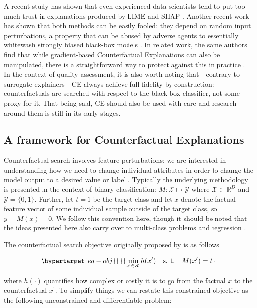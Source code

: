 \documentclass{juliacon}
\begin{document}
A recent study has shown that even experienced data scientists tend to
put too much trust in explanations produced by LIME and SHAP
\autocite{kaur2020interpreting}. Another recent work has shown that both
methods can be easily fooled: they depend on random input perturbations,
a property that can be abused by adverse agents to essentially whitewash
strongly biased black-box models \autocite{slack2020fooling}. In related
work, the same authors find that while gradient-based Counterfactual
Explanations can also be manipulated, there is a straightforward way to
protect against this in practice \autocite{slack2021counterfactual}. In
the context of quality assessment, it is also worth noting
that---contrary to surrogate explainers---CE always achieve full
fidelity by construction: counterfactuals are searched with respect to
the black-box classifier, not some proxy for it. That being said, CE
should also be used with care and research around them is still in its
early stages.

\hypertarget{sec-method}{%
\subsection{A framework for Counterfactual
Explanations}\label{sec-method}}

Counterfactual search involves feature perturbations: we are interested
in understanding how we need to change individual attributes in order to
change the model output to a desired value or label
\autocite{molnar2020interpretable}. Typically the underlying methodology
is presented in the context of binary classification:
\(M: \mathcal{X} \mapsto \mathcal{Y}\) where
\(\mathcal{X}\subset\mathbb{R}^D\) and \(\mathcal{Y}=\{0,1\}\). Further,
let \(t=1\) be the target class and let \(x\) denote the factual feature
vector of some individual sample outside of the target class, so
\(y=M(x)=0\). We follow this convention here, though it should be noted
that the ideas presented here also carry over to multi-class problems
and regression \autocite{molnar2020interpretable}.

The counterfactual search objective originally proposed by
\textcite{wachter2017counterfactual} is as follows

\begin{equation}\protect\hypertarget{eq-obj}{}{
\min_{x^\prime \in \mathcal{X}} h(x^\prime) \ \ \ \mbox{s. t.} \ \ \ M(x^\prime) = t
}\label{eq-obj}\end{equation}

where \(h(\cdot)\) quantifies how complex or costly it is to go from the
factual \(x\) to the counterfactual \(x^\prime\). To simplify things we
can restate this constrained objective as the following unconstrained
and differentiable problem:
\end{document}
